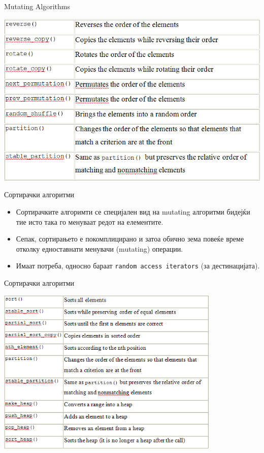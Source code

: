\begin{frame}{Mutating Algorithms}
\begin{center}
\includegraphics[width=\textwidth]{images/mutating}
\end{center}
\end{frame}

\begin{frame}{Сортирачки алгоритми}
\begin{itemize}
  \item Сортирачките алгоримти се специјален вид на mutating алгоритми бидејќи
  тие исто така го менуваат редот на елементите.
  \item Сепак, сортирањето е покомплицирано и затоа обично зема повеќе време
  отколку едноставнати менувачи (mutating) операции.
  \item Имаат потреба, односно бараат \texttt{random access iterators} (за
  дестинацијата).
\end{itemize}
\end{frame}
 

\begin{frame}{Сортирачки алгоритми}
\begin{center}
\includegraphics[width=0.8\textwidth]{images/sorting}
\end{center}
\end{frame}

